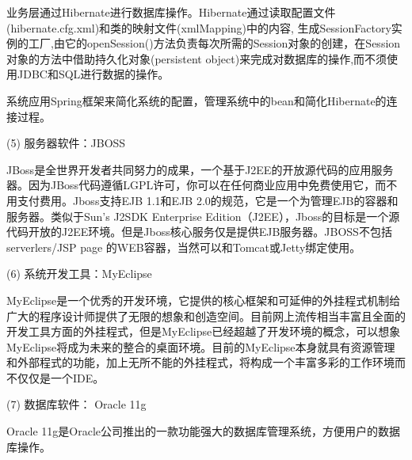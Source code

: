 业务层通过Hibernate进行数据库操作。Hibernate通过读取配置文件(hibernate.cfg.xml)和类的映射文件(xmlMapping)中的内容, 生成SessionFactory实例的工厂,由它的openSession()方法负责每次所需的Session对象的创建，在Session对象的方法中借助持久化对象(persistent object)来完成对数据库的操作,而不须使用JDBC和SQL进行数据的操作。

系统应用Spring框架来简化系统的配置，管理系统中的bean和简化Hibernate的连接过程。

(5)	服务器软件：JBOSS\par
JBoss是全世界开发者共同努力的成果，一个基于J2EE的开放源代码的应用服务器。因为JBoss代码遵循LGPL许可，你可以在任何商业应用中免费使用它，而不用支付费用。Jboss支持EJB 1.1和EJB 2.0的规范，它是一个为管理EJB的容器和服务器。类似于Sun's J2SDK Enterprise Edition（J2EE），Jboss的目标是一个源代码开放的J2EE环境。但是Jboss核心服务仅是提供EJB服务器。JBOSS不包括serverlers/JSP page 的WEB容器，当然可以和Tomcat或Jetty绑定使用。

(6)	系统开发工具：MyEclipse\par
MyEclipse是一个优秀的开发环境，它提供的核心框架和可延伸的外挂程式机制给广大的程序设计师提供了无限的想象和创造空间。目前网上流传相当丰富且全面的开发工具方面的外挂程式，但是MyEclipse已经超越了开发环境的概念，可以想象MyEclipse将成为未来的整合的桌面环境。目前的MyEclipse本身就具有资源管理和外部程式的功能，加上无所不能的外挂程式，将构成一个丰富多彩的工作环境而不仅仅是一个IDE。

(7)	数据库软件： Oracle 11g\par
Oracle 11g是Oracle公司推出的一款功能强大的数据库管理系统，方便用户的数据库操作。
